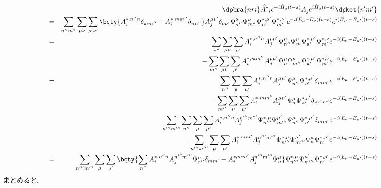 \documentclass[10.5pt,a4paper]{jreport}
\begin{document}
\begin{eqnarray}
  \nonumber  &&\dpbra{nm}\hat{A^\dagger}_ie^{-i\hat{H}_a(t-s)}A_j e^{i\hat{H}_a(t-s)}\dpket{n'm'}\\
  \nonumber &=& \sum_{n''m''}\sum_{\mu\nu}\sum_{\mu'\nu'}\bqty{A_i^{*, n''n}\delta_{mm''} - A_i^{*, mm''}\delta_{nn''}}A_j^{ {\mu\mu'}}\delta_{ {\nu\nu'}}\Psi_{n''}^{\mu}\Psi_{m''}^{\nu}\Psi_{n'}^{*, \mu'}\Psi_{m'}^{*, \nu'}e^{-i(E_\mu - E_\nu)(t-s)}e^{i(E_{\mu'} - E_{\nu'})(t-s)}\\
  \nonumber &=&\sum_{n''}\sum_{\mu\nu}\sum_{ {\mu'}}A_i^{*, n''n}A_j^{\mu\mu'}\Psi_{n''}^{\mu}\Psi_{m}^{\nu}\Psi_{n'}^{*, \mu'}\Psi_{m'}^{*, \nu}e^{ {-i(E_\mu- E_{\mu'})(t-s)}}\\
  &&- \sum_{m''}\sum_{\mu\nu}\sum_{ {\mu'}}A_i^{*, mm''}A_j^{\mu\mu'}\Psi_{n}^{\mu}\Psi_{m''}^{\nu}\Psi_{n'}^{*, \mu'}\Psi_{m'}^{*, \nu}e^{ {-i(E_\mu- E_{\mu'})(t-s)}}\\
  \nonumber &=&\sum_{n''}\sum_{ {\mu}}\sum_{ {\mu'}}A_i^{ {*, n''n}}A_j^{\mu\mu'}\Psi_{n''}^{\mu}\Psi_{n'}^{*, \mu'}\delta_{mm'}e^{ {-i(E_\mu- E_{\mu'})(t-s)}}\\
  &&- \sum_{m''}\sum_{ {\mu}}\sum_{ {\mu'}}A_i^{*, mm''}A_j^{\mu\mu'}\Psi_{n}^{\mu}\Psi_{n'}^{*, \mu'}\delta_{m'm''}e^{ {-i(E_\mu- E_{\mu'})(t-s)}}\\
  \nonumber &=&\sum_{n'''m'''}\sum_{n''}\sum_{ {\mu}}\sum_{ {\mu'}}A_i^{ {*, n''n}}A_j^{n'''m'''}\Psi_{n'''}^{*, \mu}\Psi_{m'''}^{\mu'}\Psi_{n''}^{\mu}\Psi_{n'}^{*, \mu'}\delta_{mm'}e^{ {-i(E_\mu- E_{\mu'})(t-s)}}\\
  &&- \sum_{n'''m'''}\sum_{ {\mu}}\sum_{ {\mu'}}A_i^{*, mm'}A_j^{n'''m'''}\Psi_{n'''}^{*, \mu}\Psi_{m'''}^{\mu'}\Psi_{n}^{\mu}\Psi_{n'}^{*, \mu'}e^{ {-i(E_\mu- E_{\mu'})(t-s)}}\\
  \nonumber &=&\sum_{n'''m'''}\sum_{ {\mu}}\sum_{ {\mu'}}\bqty{\sum_{n''}A_i^{ {*, n''n}}A_j^{n'''m'''}\Psi_{n''}^{\mu}\delta_{mm'} - A_i^{*, mm'}A_j^{n'''m'''}\Psi_{n}^{\mu}}\Psi_{n'''}^{*, \mu}\Psi_{m'''}^{\mu'}\Psi_{n'}^{*, \mu'}e^{ {-i(E_\mu- E_{\mu'})(t-s)}}\\
\end{eqnarray}
まとめると,
\end{document}
